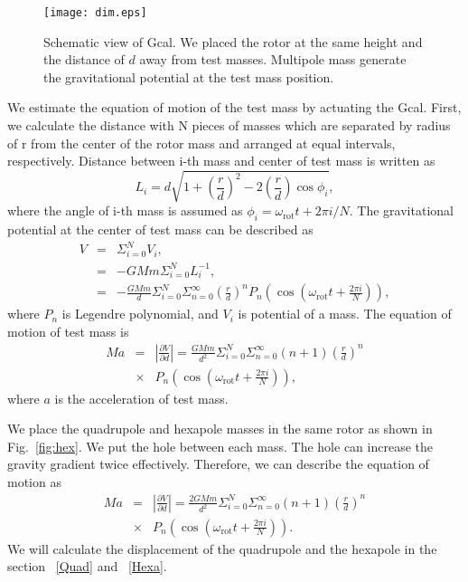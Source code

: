 \documentclass[%
 reprint,
superscriptaddress,
 amsmath,amssymb,
 aps,
]{revtex4-1}
\begin{document}
\begin{figure}
\begin{center}
\texttt{[image: dim.eps]}
\caption{Schematic view of Gcal. We placed the rotor at  the same height and the distance of $d$ away from test masses. Multipole mass generate the gravitational potential at the test mass position.}
\label{fig:dim}
\end{center}
\end{figure}
We estimate the equation of motion of the test mass by actuating the Gcal.
First, we calculate the distance with N pieces of masses which are separated by radius of r from the center of the rotor mass and arranged at equal intervals, respectively.
Distance between i-th mass and center of test mass is written as
\begin{equation}
L_i=d \sqrt{1+\left( \frac{r}{d} \right)^2 -2\left( \frac{r}{d} \right) \cos{\phi_i} },
\end{equation}
where the angle of i-th mass is assumed as $\phi_i=\omega_{\mathrm{rot}} t + 2\pi i/N$.
The gravitational potential at the center of test mass can be described as
\begin{eqnarray}
V &=& \Sigma^N_{i=0} V_i, \\
&=& -GMm \Sigma^N_{i=0}L_i^{-1},\\
&=&-\frac{G\!M\!m\!}{d} \Sigma^N_{i=0} \Sigma^{\infty}_{n=0}\! \left(\! \frac{r}{d}\! \right)^n
\!P_n\! \left(\! \cos{\!\left( \! \omega_{\mathrm{rot}} t \!+\!\frac{2 \pi i}{N}\right)\!}\right),
\end{eqnarray}
where $P_n$ is Legendre polynomial, and $V_i$ is potential of a mass. The equation of motion of test mass is 
\begin{eqnarray}
Ma&=&\left| \frac{\partial V}{\partial{d}} \right| =\frac{GMm}{d^2}\Sigma^N_{i=0} \Sigma^{\infty}_{n=0}(n+1) \left( \frac{r}{d} \right)^n \nonumber \\
&\times& P_n\left(\cos{\left(\omega_{\mathrm{rot}} t +\frac{2 \pi i}{N}\right)}\right),
\end{eqnarray}
where $a$ is the acceleration of test mass. 

We place the quadrupole and hexapole masses in the same rotor as shown in Fig.~\ref{fig:hex}. We put the hole between each mass. The hole can increase the gravity gradient twice effectively. Therefore, we can describe the equation of motion as 
\begin{eqnarray}
Ma&=&\left| \frac{\partial V}{\partial{d}} \right| =\frac{2GMm}{d^2}\Sigma^N_{i=0} \Sigma^{\infty}_{n=0}(n+1) \left( \frac{r}{d} \right)^n \nonumber \\
&\times& P_n\left(\cos{\left(\omega_{\mathrm{rot}} t +\frac{2 \pi i}{N}\right)}\right). \label{eq:EOM}
\end{eqnarray}
We will calculate the displacement of the quadrupole and the hexapole in the section ~\ref{Quad}  and ~\ref{Hexa}.
\end{document}
